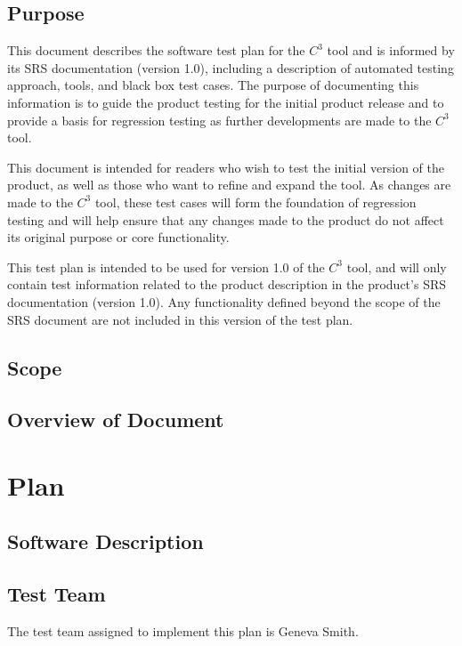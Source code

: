 \documentclass[12pt, titlepage]{article}
\newcommand{\prognameAbbrv}{$C^{3}$}
\begin{document}
\subsection{Purpose}
This document describes the software test plan for the \prognameAbbrv{} tool 
and is informed by its SRS documentation (version 1.0), including a description 
of automated testing approach, tools, and black box test cases. The purpose of 
documenting this information is to guide the product testing for the initial 
product release and to provide a basis for regression testing as further 
developments are made to the \prognameAbbrv{} tool.

This document is intended for readers who wish to test the initial version of 
the product, as well as those who want to refine and expand the tool. As 
changes are made to the \prognameAbbrv{} tool, these test cases will form the 
foundation of regression testing and will help ensure that any changes made to 
the product do not affect its original purpose or core functionality.

This test plan is intended to be used for version 1.0 of the \prognameAbbrv{} 
tool, and will only contain test information related to the product description 
in the product's SRS documentation (version 1.0). Any functionality defined 
beyond the scope of the SRS document are not included in this version of the 
test plan.

\subsection{Scope}

\subsection{Overview of Document}

\section{Plan}
	
\subsection{Software Description}

\subsection{Test Team}

The test team assigned to implement this plan is Geneva Smith.
\end{document}
